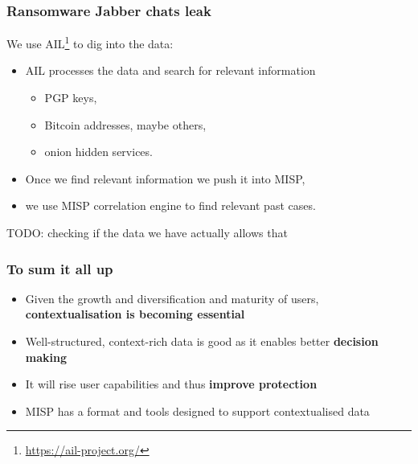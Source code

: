 \begin{frame}
    \frametitle{Ransomware Jabber chats leak}
    We use AIL\footnote{\url{https://ail-project.org/}} to dig into the data:
    \begin{itemize}
        \item AIL processes the data and search for relevant information
        \begin{itemize}
        \item PGP keys,
        \item Bitcoin addresses, maybe others,
        \item onion hidden services.
        \end{itemize}
    \item Once we find relevant information we push it into MISP,
    \item we use MISP correlation engine to find relevant past cases.
    \end{itemize}
    TODO: checking if the data we have actually allows that
\end{frame}

\begin{frame}
    \frametitle{To sum it all up}
    \begin{itemize}
        \item Given the growth and diversification and maturity of users, \textbf{contextualisation is becoming essential}
        \item Well-structured, context-rich data is good as it enables better \textbf{decision making}
        \item It will rise user capabilities and thus \textbf{improve protection}
        \item MISP has a format and tools designed to support contextualised data
    \end{itemize}
\end{frame}

